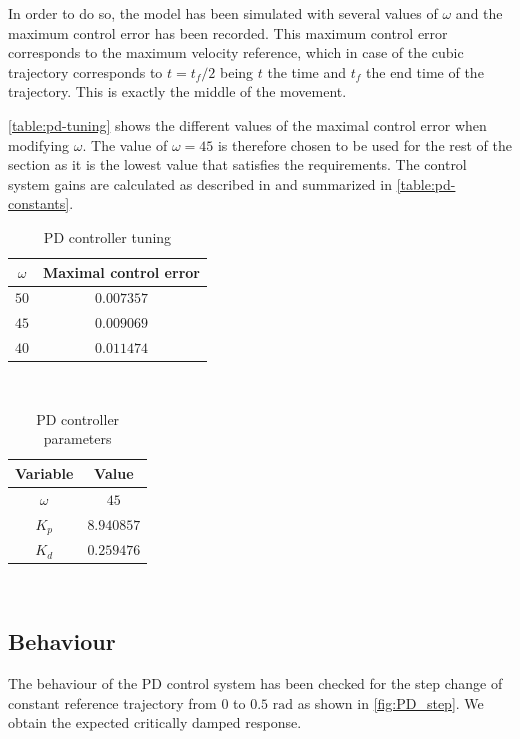 In order to do so, the model has been simulated with several values of $\omega$
and the maximum control error has been recorded. This maximum control error
corresponds to the maximum velocity reference, which in case of the cubic
trajectory corresponds to $t = t_f/2$ being $t$ the time and $t_f$ the end time
of the trajectory. This is exactly the middle of the movement.

\autoref{table:pd-tuning} shows the different values of the maximal control
error when modifying $\omega$. The value of $\omega = 45$ is therefore chosen to
be used for the rest of the section as it is the lowest value that satisfies
the requirements. The control system gains are calculated as described in
 \cite{SingleLink} and summarized in \autoref{table:pd-constants}.

\begin{table}
    \centering
    \begin{tabular}{c | c}
        $\omega$ & Maximal control error \\ \hline\hline
        $50$ & $0.007357$ \\ \hline
        $45$ & $0.009069$ \\ \hline
        $40$ & $0.011474$ \\ \hline
    \end{tabular}
    \\ [1ex]
    \caption{PD controller tuning}
    \label{table:pd-tuning}
\end{table}

\begin{table}
    \centering
    \begin{tabular}{c | c}
        Variable & Value \\ \hline\hline
        $\omega$ & $45$ \\ \hline
        $K_p$ & $8.940857$ \\ \hline
        $K_d$ & $0.259476$ \\ \hline
    \end{tabular}
    \\ [1ex]
    \caption{PD controller parameters}
    \label{table:pd-constants}
\end{table}

\subsection{Behaviour}
\label{subsec:pd-behaviour}
The behaviour of the PD control system has been checked for the step change of
constant reference trajectory from $0$ to $0.5\text{ rad}$ as shown in
\autoref{fig:PD_step}. We obtain the expected critically damped response.

